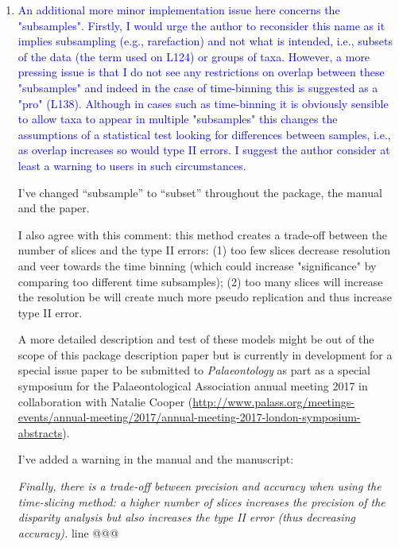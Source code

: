 \documentclass[12pt,letterpaper]{article}
\begin{document}
\begin{enumerate}
\item{\textcolor{blue}{An additional more minor implementation issue here concerns the "subsamples". Firstly, I would urge the author to reconsider this name as it implies subsampling (e.g., rarefaction) and not what is intended, i.e., subsets of the data (the term used on L124) or groups of taxa. However, a more pressing issue is that I do not see any restrictions on overlap between these "subsamples" and indeed in the case of time-binning this is suggested as a "pro" (L138). Although in cases such as time-binning it is obviously sensible to allow taxa to appear in multiple "subsamples" this changes the assumptions of a statistical test looking for differences between samples, i.e., as overlap increases so would type II errors. I suggest the author consider at least a warning to users in such circumstances.}}

I've changed ``subsample'' to ``subset'' throughout the package, the manual and the paper.

I also agree with this comment: this method creates a trade-off between the number of slices and the type II errors: %
(1) too few slices decrease resolution and veer towards the time binning (which could increase "significance" by comparing too different time subsamples);
(2) too many slices will increase the resolution be will create much more pseudo replication and thus increase type II error.

A more detailed description and test of these models might be out of the scope of this package description paper but is currently in development for a special issue paper to be submitted to \textit{Palaeontology} as part as a special symposium for the Palaeontological Association annual meeting 2017 in collaboration with Natalie Cooper (\url{http://www.palass.org/meetings-events/annual-meeting/2017/annual-meeting-2017-london-symposium-abstracts}).

I've added a warning in the manual and the manuscript:

\textit{Finally, there is a trade-off between precision and accuracy when using the time-slicing method: a higher number of slices increases the precision of the disparity analysis but also increases the type II error (thus decreasing accuracy).} line @@@


\end{enumerate}
\end{document}
